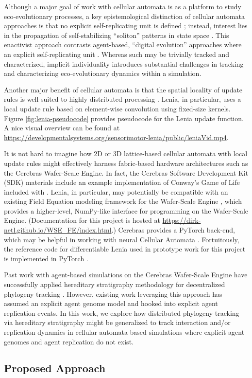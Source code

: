 Although a major goal of work with cellular automata is as a platform to study eco-evolutionary processes, a key epistemological distinction of cellular automata approaches is that no explicit self-replicating unit is defined \citep{hamon2022learning}; instead, interest lies in the propagation of self-stabilizing ``soliton'' patterns in state space \citep{chan2019lenia}.
This enactivist approach contrasts agent-based, ``digital evolution'' approaches where an explicit self-replicating unit \citep{pennock2007models}.
Whereas such may be trivially tracked and characterized, implicit individuality introduces substantial challenges in tracking and characterizing eco-evolutionary dynamics within a simulation.

Another major benefit of cellular automata is that the spatial locality of update rules is well-suited to highly distributed processing \citep{ackley2023robust}.
Lenia, in particular, uses a local update rule based on element-wise convolution using fixed-size kernels.
Figure \ref{fig:lenia-pseudocode} provides pseudocode for the Lenia update function.
A nice visual overview can be found at \url{https://developmentalsystems.org/sensorimotor-lenia/public/leniaVid.mp4}.

It is not hard to imagine how 2D or 3D lattice-based cellular automata with local update rules might effectively harness fabric-based hardware architectures such as the Cerebras Wafer-Scale Engine.
In fact, the Cerebras Software Development Kit (SDK) materials include an example implementation of Conway's Game of Life included with \citep{cerebras2024gol}.
Lenia, in particular, may potentially be compatible with an existing Field Equation modeling framework for the Wafer-Scale Engine \citep{woo2022disruptive}, which provides a higher-level, NumPy-like interface for programming on the Wafer-Scale Engine.
(Documentation for this project is hosted at \url{https://dirk-netl.github.io/WSE_FE/index.html}.)
Cerebras provides a PyTorch back-end, which may be helpful in working with neural Cellular Automata \citep{cerebras2022pytorch}.
Fortuitously, the reference code for differentiable Lenia used in prototype work for this project is implemented in PyTorch \citep{hamon2022learning}.

Past work with agent-based simulations on the Cerebras Wafer-Scale Engine have successfully applied hereditary stratigraphy methodology for decentralized phylogeny tracking \citep{moreno2024trackable}.
However, existing work leveraging this approach has assumed an explicit agent genome model and hooked into explicit agent replication events.
In this work, we explore how distributed phylogeny tracking via hereditary stratigraphy might be generalized to track interaction and/or replication dynamics in cellular automata-based simulations where explicit agent genomes and agent replication do not exist.

\subsection{Proposed Approach}


